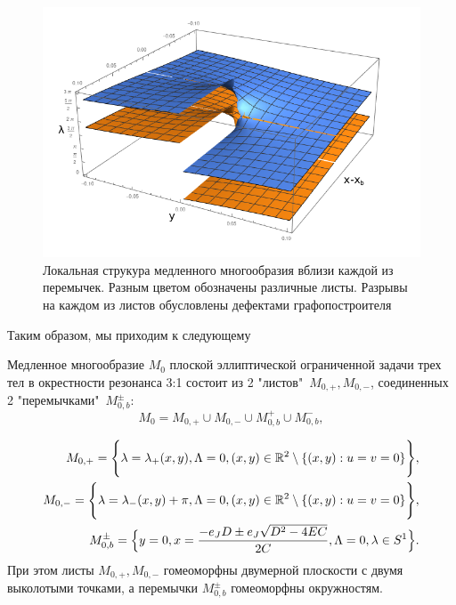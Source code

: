 \begin{figure}[H]
\centering
\includegraphics[scale=0.55]{img/local2.png}
\caption{Локальная струкура медленного многообразия вблизи каждой из перемычек. Разным цветом обозначены различные листы. Разрывы на каждом из листов обусловлены дефектами графопостроителя}
\end{figure}

Таким образом, мы приходим к следующему

\begin{utv}

Медленное многообразие $M_0$ плоской эллиптической ограниченной задачи трех тел в окрестности резонанса 3:1 состоит из 2 "листов"\, $M_{0,+}, M_{0,-}$, соединенных 2 "перемычками"\, $M_{0,b}^{\pm}$:
$$M_0 = M_{0,+} \cup M_{0,-} \cup M_{0,b}^{+} \cup M_{0,b}^{-},$$

\begin{eqnarray}
\nonumber
M_{0,+} = \Biggl\{ 
    \lambda = \lambda_{+}(x,y),
       \Lambda = 0,
       (x,y) \in \mathbb{R}^2 \setminus \{ (x,y): u=v=0 \}
       \Biggr\},\\
M_{0,-} = \Biggl\{ 
    \lambda = \lambda_{-}(x,y) + \pi,
       \Lambda = 0,
       (x,y) \in \mathbb{R}^2 \setminus \{ (x,y): u=v=0 \}
       \Biggr\},\\
M_{0,b}^{\pm} = \Bigl\{ y=0, x=\frac{-e_JD \pm e_J \sqrt{D^2-4EC}}{2C}, \Lambda = 0, \lambda \in S^1 \Bigr\}.
\end{eqnarray}
При этом листы $M_{0,+}, M_{0,-}$ гомеоморфны двумерной плоскости с двумя выколотыми точками, а перемычки $M_{0,b}^{\pm}$ гомеоморфны окружностям. 
\end{utv}

